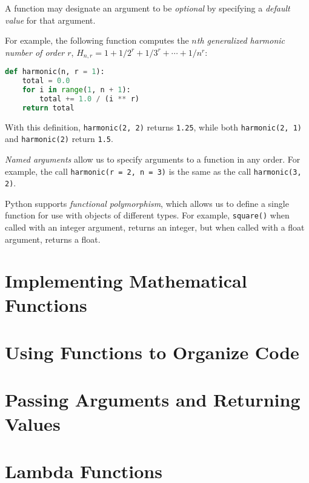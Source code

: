 \documentclass[8pt,a4paper,compress,handout]{beamer}
\begin{document}
\begin{frame}[fragile]
A function may designate an argument to be \emph{optional} by specifying a \emph{default value} for that argument.

\bigskip

For example, the following function computes the \emph{$n$th generalized harmonic number of order $r$}, $H_{n,r}=1+1/2^r+1/3^r+\cdots+1/n^r$:

\begin{lstlisting}[language=Python]
def harmonic(n, r = 1):
    total = 0.0
    for i in range(1, n + 1):
        total += 1.0 / (i ** r)
    return total
\end{lstlisting}
With this definition, \lstinline{harmonic(2, 2)} returns \lstinline{1.25}, while both \lstinline{harmonic(2, 1)} and \lstinline{harmonic(2)} return \lstinline{1.5}.

\bigskip

\emph{Named arguments} allow us to specify arguments to a function in any order. For example, the call \lstinline{harmonic(r = 2, n = 3)} is the same as the call \lstinline{harmonic(3, 2)}.

\bigskip

Python supports \emph{functional polymorphism}, which allows us to define a single function for use with objects of different types. For example, \lstinline{square()} when called with an integer argument, returns an integer, but when called with a float argument, returns a float.

\end{frame}

\section{Implementing Mathematical Functions}

\section{Using Functions to Organize Code}

\section{Passing Arguments and Returning Values}

\section{Lambda Functions}
\end{document}
